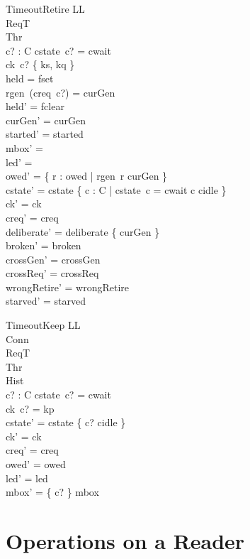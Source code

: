 \documentclass[a4paper,10pt,fleqn]{article}
\begin{document}
\begin{schema}{TimeoutRetire}
  \Delta LL \\
  \Xi ReqT \\
  \Xi Thr \\
  c? : C
\where
  cstate~c? = cwait \\
  ck~c? \in \{ ks, kq \} \\
  held = fset \\
  rgen~(creq~c?) = curGen \\
  held' = fclear \\
  curGen' = curGen \\
  started' = started \\
  mbox' = \emptyset \\
  led' = \emptyset \\
  owed' = \{ r : owed | rgen~r \neq curGen \} \\
  cstate' = cstate \oplus \{ c : C | cstate~c = cwait \spot c \mapsto cidle \} \\
  ck' = ck \\
  creq' = creq \\
  deliberate' = deliberate \cup \{ curGen \} \\
  broken' = broken \\
  crossGen' = crossGen \\
  crossReq' = crossReq \\
  wrongRetire' = wrongRetire \\
  starved' = starved
\end{schema}

\begin{schema}{TimeoutKeep}
  \Delta LL \\
  \Xi Conn \\
  \Xi ReqT \\
  \Xi Thr \\
  \Xi Hist \\
  c? : C
\where
  cstate~c? = cwait \\
  ck~c? = kp \\
  cstate' = cstate \oplus \{ c? \mapsto cidle \} \\
  ck' = ck \\
  creq' = creq \\
  owed' = owed \\
  led' = led \\
  mbox' = \{ c? \} \ndres mbox
\end{schema}

\section{Operations on a Reader}
\end{document}
